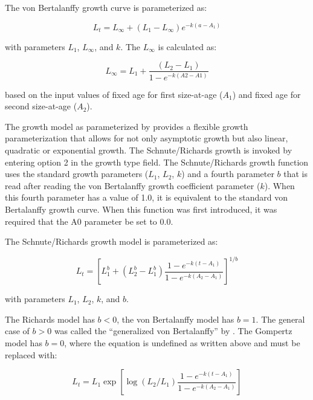 
The von Bertalanffy growth curve is parameterized as:

\begin{equation}
	L_t = L_\infty + (L_{1}-L_\infty)e^{-k(a-A_{1})}
\end{equation}

with parameters $L_{1}$, $L_\infty$, and $k$. The $L_\infty$ is calculated as:

\begin{equation}
	L_\infty = L_{1} + \frac{(L_2 - L_1)}{1-e^{-k(A2-A1)}}
\end{equation}

based on the input values of fixed age for first size-at-age ($A_1$) and fixed age for second size-at-age ($A_2$). 

The \citet{richards1959growth} growth model as parameterized by \citet{schnute1981growth} provides a flexible growth parameterization that allows for not only asymptotic growth but also linear, quadratic or exponential growth. The Schnute/Richards growth is invoked by entering option 2 in the growth type field. The Schnute/Richards growth function uses the standard growth parameters ($L_1$, $L_2$, $k$) and a fourth parameter $b$ that is read after reading the von Bertalanffy growth coefficient parameter ($k$). When this fourth parameter has a value of 1.0, it is equivalent to the standard von Bertalanffy growth curve. When this function was first introduced, it was required that the A0 parameter be set to 0.0.

The Schnute/Richards growth model is parameterized as:

\begin{equation}
	L_t = \left[L_1^b + (L_2^b-L_1^b)\frac{1-e^{-k(t-A_{1})}}{1-e^{-k(A_2-A_1)}}\right]^{1/b}
\end{equation}

with parameters $L_1$, $L_2$, $k$, and $b$.

The Richards model has $b<0$, the von Bertalanffy model has $b=1$. The general case of $b>0$ was called the ``generalized von Bertalanffy'' by \citet{schnute1981growth}. The Gompertz model has $b=0$, where the equation is undefined as written above and must be replaced with: 

\begin{equation}
	L_t = L_1\exp\left[\log(L_2/L_1)\frac{1-e^{-k(t-A_1)}}{1-e^{-k(A_2-A_1)}}\right]
\end{equation}

